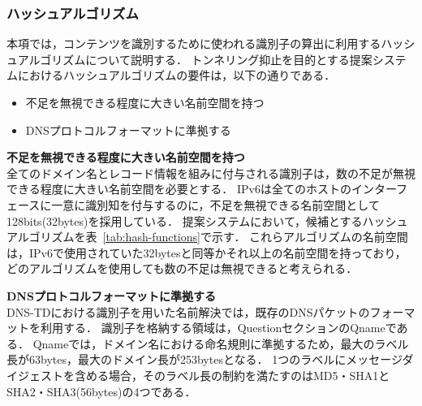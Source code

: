 \subsubsection{ハッシュアルゴリズム}
本項では，コンテンツを識別するために使われる識別子の算出に利用するハッシュアルゴリズムについて説明する．
トンネリング抑止を目的とする提案システムにおけるハッシュアルゴリズムの要件は，以下の通りである．
\begin{itemize}
 \item 不足を無視できる程度に大きい名前空間を持つ
 \vspace{-3mm}
 \item DNSプロトコルフォーマットに準拠する
\end{itemize}

\hspace{-12pt}\textbf{不足を無視できる程度に大きい名前空間を持つ}\\
\hspace{12pt}全てのドメイン名とレコード情報を組みに付与される識別子は，数の不足が無視できる程度に大きい名前空間を必要とする．
IPv6は全てのホストのインターフェースに一意に識別知を付与するのに，不足を無視できる名前空間として128bits(32bytes)を採用している．
提案システムにおいて，候補とするハッシュアルゴリズムを表~\ref{tab:hash-functions}で示す．
これらアルゴリズムの名前空間は，IPv6で使用されていた32bytesと同等かそれ以上の名前空間を持っており，どのアルゴリズムを使用しても数の不足は無視できると考えられる．\newline

\newpage


\hspace{-12pt}\textbf{DNSプロトコルフォーマットに準拠する}\\
\hspace{12pt}DNS-TDにおける識別子を用いた名前解決では，既存のDNSパケットのフォーマットを利用する．
識別子を格納する領域は，QuestionセクションのQnameである．
Qnameでは，ドメイン名における命名規則に準拠するため，最大のラベル長が63bytes，最大のドメイン長が253bytesとなる．
1つのラベルにメッセージダイジェストを含める場合，そのラベル長の制約を満たすのはMD5・SHA1とSHA2・SHA3(56bytes)の4つである．\newline

